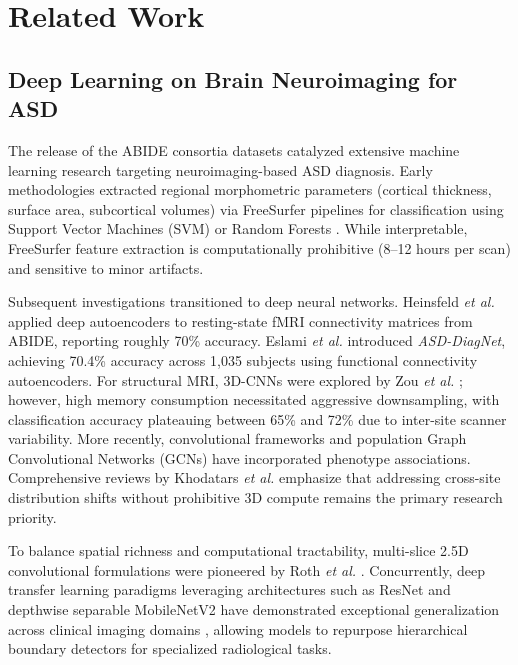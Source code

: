 \documentclass[conference]{IEEEtran}
\begin{document}
\section{Related Work}

\subsection{Deep Learning on Brain Neuroimaging for ASD}
The release of the ABIDE consortia datasets \cite{dimartino2014autism, dimartino2017abide2} catalyzed extensive machine learning research targeting neuroimaging-based ASD diagnosis. Early methodologies extracted regional morphometric parameters (cortical thickness, surface area, subcortical volumes) via FreeSurfer pipelines for classification using Support Vector Machines (SVM) or Random Forests \cite{ecker2010investigating}. While interpretable, FreeSurfer feature extraction is computationally prohibitive (8--12 hours per scan) and sensitive to minor artifacts.

Subsequent investigations transitioned to deep neural networks. Heinsfeld \emph{et al.} \cite{heinsfeld2018identification} applied deep autoencoders to resting-state fMRI connectivity matrices from ABIDE, reporting roughly 70\% accuracy. Eslami \emph{et al.} \cite{eslami2019asd} introduced \emph{ASD-DiagNet}, achieving 70.4\% accuracy across 1,035 subjects using functional connectivity autoencoders. For structural MRI, 3D-CNNs were explored by Zou \emph{et al.} \cite{zou20173d}; however, high memory consumption necessitated aggressive downsampling, with classification accuracy plateauing between 65\% and 72\% due to inter-site scanner variability. More recently, convolutional frameworks \cite{aghdam2019analysis, sharif2021novel} and population Graph Convolutional Networks (GCNs) \cite{parisot2018disease} have incorporated phenotype associations. Comprehensive reviews by Khodatars \emph{et al.} \cite{khodatars2021deep} emphasize that addressing cross-site distribution shifts without prohibitive 3D compute remains the primary research priority.

To balance spatial richness and computational tractability, multi-slice 2.5D convolutional formulations were pioneered by Roth \emph{et al.} \cite{roth2015deeporgan}. Concurrently, deep transfer learning paradigms leveraging architectures such as ResNet \cite{he2016deep} and depthwise separable MobileNetV2 \cite{sandler2018mobilenetv2} have demonstrated exceptional generalization across clinical imaging domains \cite{esteva2017dermatologist}, allowing models to repurpose hierarchical boundary detectors for specialized radiological tasks.
\end{document}

